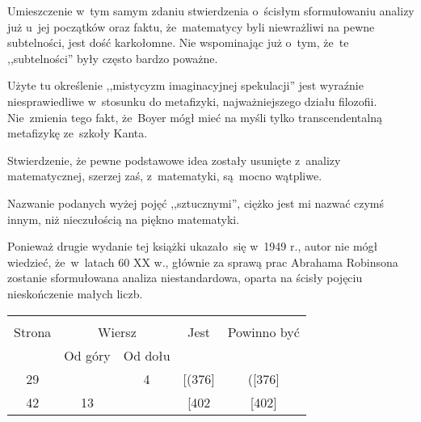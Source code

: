 \documentclass[a4paper,11pt]{article}
\begin{document}
\vspace{\spaceThree}



\vspace{\spaceFour}


\start {} Umieszczenie w~tym samym zdaniu stwierdzenia
o~ścisłym sformułowaniu analizy już u~jej początków oraz faktu,
że~matematycy byli niewrażliwi na pewne subtelności, jest dość
karkołomne. Nie wspominając już o~tym, że~te ,,subtelności'' były
często bardzo poważne.

\vspace{\spaceFour}


\start {} Użyte tu określenie ,,mistycyzm imaginacyjnej
spekulacji'' jest wyraźnie niesprawiedliwe w~stosunku do metafizyki,
najważniejszego działu filozofii. Nie~zmienia tego fakt, że~Boyer mógł
mieć na myśli tylko transcendentalną metafizykę ze~szkoły Kanta.

\vspace{\spaceFour}


\start {} Stwierdzenie, że pewne podstawowe idea zostały
usunięte z~analizy matematycznej, szerzej zaś, z~matematyki, są~mocno
wątpliwe.

\vspace{\spaceFour}


\start {} Nazwanie podanych wyżej pojęć ,,sztucznymi'',
ciężko jest mi nazwać czymś innym, niż nieczułością na piękno
matematyki.

\vspace{\spaceFour}


\start {} Ponieważ drugie wydanie tej książki ukazało~się w~1949
r., autor nie mógł wiedzieć, że~w~latach 60 XX w., głównie za sprawą
prac Abrahama Robinsona zostanie sformułowana analiza niestandardowa,
oparta na ścisły pojęciu nieskończenie małych liczb.


\begin{center}
  \begin{tabular}{|c|c|c|c|c|}
    \hline
    & \multicolumn{2}{c|}{} & & \\
    Strona & \multicolumn{2}{c|}{Wiersz}& Jest & Powinno być \\ \cline{2-3}
    & Od góry & Od dołu &  &  \\ \hline
    29 & & 4 & [(376] & ([376] \\
    42 & 13 & & [402 & [402] \\
    \hline
  \end{tabular}
\end{center}
\end{document}

